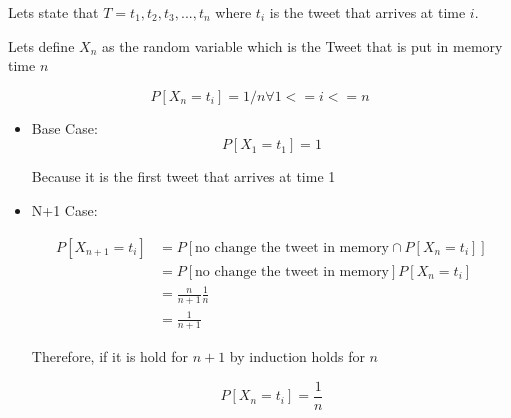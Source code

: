 \documentclass[12pt, a4paper]{article}
\begin{document}
Lets state that $T = {t_1, t_2, t_3, ..., t_n}$ where $t_i$ is the tweet that
arrives at time $i$.

Lets define $X_n$ as the random variable which is the Tweet that is put in
memory time $n$

\begin{equation}
  P[X_n = t_i] = 1/n \forall 1 <= i <= n
\end{equation}

\begin{itemize}
\item{
    Base Case: \\
    \begin{equation}
      P[X_1 = t_1] = 1
    \end{equation}

    Because it is the first tweet that arrives at time 1
   
  }

\item{
    N+1 Case:
    
    \begin{subequations}
      \begin{align}
        P[X_{n+1} = t_i] &= P[\text{no change the tweet in memory} \cap P[X_n = t_i]] \\
                         &= P[\text{no change the tweet in memory}]P[X_n=t_i] \\
                         &= \frac{n}{n+1}\frac{1}{n} \\
                         &= \frac{1}{n+1}
      \end{align}
    \end{subequations}

}

Therefore, if it is hold for $n+1$ by induction holds for $n$

\begin{equation}
  P[X_n = t_i] = \frac{1}{n}
\end{equation}


\end{itemize}
\end{document}
